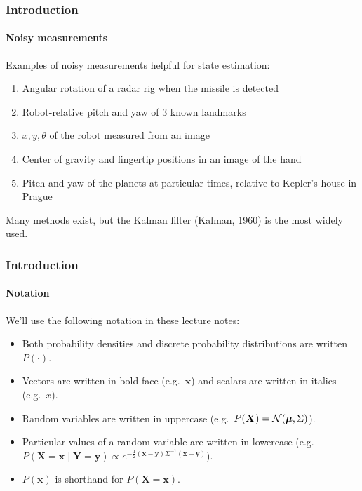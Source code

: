 \documentclass[aspectratio=169]{beamer}
\renewcommand{\vec}[1]{\boldsymbol{#1}}
\def\norm{\mbox{$\cal{N}$}}
\begin{document}
\begin{frame}
\frametitle{Introduction}
\framesubtitle{Noisy measurements}

\begin{block}{Examples of noisy measurements helpful for state estimation:}
\begin{enumerate}
\item Angular rotation of a radar rig when the missile is detected
\item Robot-relative pitch and yaw of 3 known landmarks
\item $x,y,\theta$ of the robot measured from an image
\item Center of gravity and fingertip positions in an image of the hand
\item Pitch and yaw of the planets at particular times, relative to
  Kepler's house in Prague
\end{enumerate}
\end{block}

\medskip

Many methods exist, but the \alert{Kalman filter} (Kalman, 1960) is
the most widely used.

\end{frame}


\begin{frame}
\frametitle{Introduction}
\framesubtitle{Notation}

We'll use the following notation in these lecture notes:
\begin{itemize}
\item Both probability densities and discrete probability
distributions are written $P(\cdot)$.
\item Vectors are written in bold face (e.g.\ $\vec{x}$) and scalars
  are written in italics (e.g.\ $x$).
\item Random variables are written in uppercase (e.g.\ $P(\vec{X}) =
  \norm( \vec{\mu}, \Sigma )$).
\item Particular values of a random variable are written in lowercase
  (e.g.\ $P(\vec{X}=\vec{x} \mid \vec{Y}=\vec{y}) \propto e^{
  -\frac{1}{2} (\vec{x}-\vec{y}) \Sigma^{-1} (\vec{x}-\vec{y})}$).
\item $P(\vec{x})$ is shorthand for $P(\vec{X}=\vec{x})$.
\end{itemize}
\end{frame}
\end{document}

